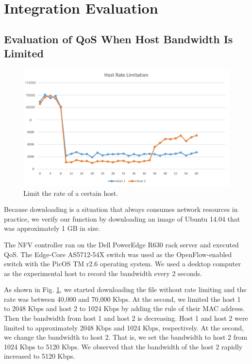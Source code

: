 \section{Integration Evaluation}


\subsection{Evaluation of QoS When Host Bandwidth Is Limited}

\begin{figure}[!t]
\centering
\includegraphics[width=\textwidth]{./fig/integration_host.png}
\caption{Limit the rate of a certain host.}
\label{fig:integration_host}
\end{figure}

Because downloading is a situation that always consumes network resources in practice,
we verify our function by downloading an image of Ubuntu 14.04 that was approximately 1 GB in size.

The NFV controller ran on the Dell PowerEdge R630 rack server and executed QoS.
The Edge-Core AS5712-54X \cite{edge-core-switch} switch was used as the OpenFlow-enabled switch with the PicOS TM r2.6 operating system.
We used a desktop computer as the experimental host to record the bandwidth every 2 seconds.

As shown in Fig. \ref{fig:integration_host}, we started downloading the file without rate limiting and the rate was between 40,000 and 70,000 Kbps.
At the  second, we limited the host 1 to 2048 Kbps and host 2 to 1024 Kbps by adding the rule of their MAC address.
Then the bandwidth from host 1 and host 2 is decreasing. Host 1 and host 2 were limited to approximately 2048 Kbps and 1024 Kbps, respectively.
At the  second, we change the bandwidth to host 2. That is, we set the bandwidth to host 2 from 1024 Kbps to 5120 Kbps.
We observed that the bandwidth of the host 2 rapidly increased to 5120 Kbps.




